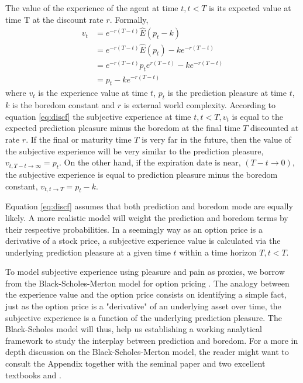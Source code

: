\documentclass[11pt, onecolumn]{article}
\begin{document}
The value of the experience of the agent at time $t, t < T$ is its expected value at time T at the discount rate $r$. Formally,
\begin{equation}
\begin{split}
    v_t  & =  e^{-r(T-t)}\hat{E}(p_{t} - k)  \\
       & = e^{-r(T-t)}\hat{E}(p_{t}) - k e^{-r(T-t)} \\
       & = e^{-r(T-t)}p_{t} e^{r(T-t)}  - k e^{-r(T-t)} \\ 
        & = p_{t}  - k e^{-r(T-t)} 
\end{split}
\label{eq:discf}
\end{equation}
where $v_t$ is the experience value at time $t$, $p_{t}$ is the prediction pleasure at time $t$, $k$ is the boredom constant and $r$ is external world complexity.   
According to equation \ref{eq:discf} the subjective experience at time $t, t < T, v_t$ is equal to the expected prediction pleasure minus the boredom at the final time $T$ discounted at rate $r$. 
If the final or maturity time $T$ is very far in the future, then the value of the subjective experience will be very similar to the prediction pleasure, $ v_{t,T -t \to \infty} =  p_{t}$. On the other hand, if the expiration date is near, $(T-t \to 0)$, the subjective experience is equal to prediction pleasure minus the boredom constant, $ v_{t,t \to T} =  p_{t} - k $. 

Equation \ref{eq:discf} assumes that both prediction and boredom mode are equally likely. A more realistic model will weight the prediction and boredom terms by their respective probabilities. 
In a seemingly way as an option price is a derivative of a stock price, a subjective experience value is calculated via the underlying prediction pleasure at a given time $t$ within a time horizon $T, t < T$. 

To model subjective experience using pleasure and pain as proxies, we borrow from the Black-Scholes-Merton model for option pricing  \citep{black_pricing_1973}. The analogy between the experience value and the option price consists on identifying a simple fact, just as the option price is a "derivative" of an underlying asset over time, the subjective experience is a function of the underlying prediction pleasure. 
The Black-Scholes model will thus, help us establishing a working analytical framework to study the interplay between prediction and boredom. For a more in depth discussion on the Black-Scholes-Merton model, the reader might want to consult the Appendix together with the seminal paper \citep{black_pricing_1973} and two excellent textbooks \citep{hull_options_2005} and \citep{duffie_dynamic_2001}.
\end{document}
